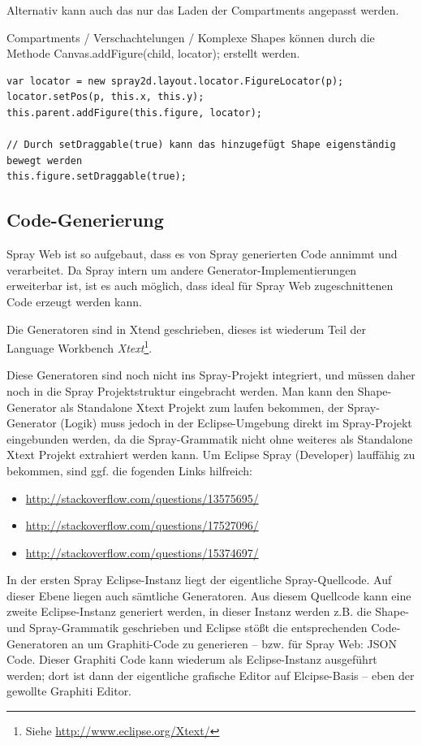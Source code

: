 Alternativ kann auch das nur das Laden der Compartments angepasst werden.

Compartments / Verschachtelungen / Komplexe Shapes können durch die Methode Canvas.addFigure(child, locator); erstellt werden.

\begin{verbatim}
var locator = new spray2d.layout.locator.FigureLocator(p);
locator.setPos(p, this.x, this.y);
this.parent.addFigure(this.figure, locator);

// Durch setDraggable(true) kann das hinzugefügt Shape eigenständig bewegt werden
this.figure.setDraggable(true);
\end{verbatim}

\subsection{Code-Generierung}

Spray Web ist so aufgebaut, dass es von Spray generierten Code annimmt
und verarbeitet. Da Spray intern um andere Generator-Implementierungen
erweiterbar ist, ist es auch möglich, dass ideal für Spray Web
zugeschnittenen Code erzeugt werden kann.

Die Generatoren sind in Xtend geschrieben, dieses ist wiederum Teil
der Language Workbench
\emph{Xtext}\footnote{Siehe \url{http://www.eclipse.org/Xtext/}}.

Diese Generatoren sind noch nicht ins Spray-Projekt integriert, und müssen
daher noch in die Spray Projektstruktur eingebracht werden.
Man kann den Shape-Generator als Standalone Xtext Projekt zum laufen bekommen,
der Spray-Generator (Logik) muss jedoch in der Eclipse-Umgebung direkt
im Spray-Projekt eingebunden werden, da die Spray-Grammatik nicht ohne
weiteres als Standalone Xtext Projekt extrahiert werden kann.
Um Eclipse Spray (Developer) lauffähig zu bekommen, sind ggf. die fogenden
Links hilfreich:

\begin{itemize}
  \item \url{http://stackoverflow.com/questions/13575695/}
  \item \url{http://stackoverflow.com/questions/17527096/}
  \item \url{http://stackoverflow.com/questions/15374697/}
\end{itemize}

\noindent In der ersten Spray Eclipse-Instanz liegt der eigentliche
Spray-Quellcode. Auf dieser Ebene liegen auch sämtliche Generatoren.
Aus diesem Quellcode kann eine zweite Eclipse-Instanz generiert werden,
in dieser Instanz werden z.B. die Shape- und Spray-Grammatik geschrieben
und Eclipse stößt die entsprechenden Code-Generatoren an um Graphiti-Code
zu generieren -- bzw. für Spray Web: JSON Code.
Dieser Graphiti Code kann wiederum als Eclipse-Instanz ausgeführt werden;
dort ist dann der eigentliche grafische Editor auf Elcipse-Basis -- eben
der gewollte Graphiti Editor.


